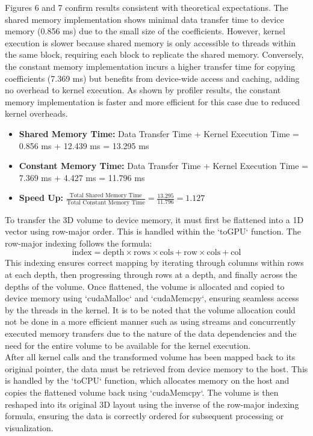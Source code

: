 \documentclass[journal,11pt]{IEEEtran}
\begin{document}
Figures 6 and 7 confirm results consistent with theoretical expectations. The shared memory implementation shows minimal data transfer time to device memory (0.856 ms) due to the small size of the coefficients. However, kernel execution is slower because shared memory is only accessible to threads within the same block, requiring each block to replicate the shared memory. Conversely, the constant memory implementation incurs a higher transfer time for copying coefficients (7.369 ms) but benefits from device-wide access and caching, adding no overhead to kernel execution. As shown by profiler results, the constant memory implementation is faster and more efficient for this case due to reduced kernel overheads.

\begin{itemize}
    \item \textbf{Shared Memory Time:} Data Transfer Time + Kernel Execution Time = 0.856 ms + 12.439 ms = 13.295 ms
    \item \textbf{Constant Memory Time:} Data Transfer Time + Kernel Execution Time = 7.369 ms + 4.427 ms = 11.796 ms
    \item \textbf{Speed Up:} $\frac{\text{Total Shared Memory Time}}{\text{Total Constant Memory Time}} = \frac{13.295}{11.796} = 1.127$
\end{itemize}

To transfer the 3D volume to device memory, it must first be flattened into a 1D vector using row-major order. This is handled within the `toGPU` function. The row-major indexing follows the formula:  
\begin{equation}
    \text{index} = \text{depth} \times \text{rows} \times \text{cols} + \text{row} \times \text{cols} + \text{col}
\end{equation}  
This indexing ensures correct mapping by iterating through columns within rows at each depth, then progressing through rows at a depth, and finally across the depths of the volume. Once flattened, the volume is allocated and copied to device memory using `cudaMalloc` and `cudaMemcpy`, ensuring seamless access by the threads in the kernel. It is to be noted that the volume allocation could not be done in a more efficient manner such as using streams and concurrently executed memory transfers due to the nature of the data dependencies and the need for the entire volume to be available for the kernel execution.\\

After all kernel calls and the transformed volume has been mapped back to its original pointer, the data must be retrieved from device memory to the host. This is handled by the `toCPU` function, which allocates memory on the host and copies the flattened volume back using `cudaMemcpy`. The volume is then reshaped into its original 3D layout using the inverse of the row-major indexing formula, ensuring the data is correctly ordered for subsequent processing or visualization.\\
\end{document}
